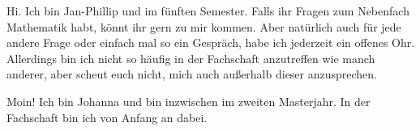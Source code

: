 \begin{multicols*}{2}
{Hi. Ich bin Jan-Phillip und im fünften Semester.
	Falls ihr Fragen zum Nebenfach Mathematik habt, könnt ihr gern zu mir kommen. Aber natürlich auch für jede andere Frage oder einfach mal so ein Gespräch, habe ich jederzeit ein offenes Ohr. Allerdings bin ich nicht so häufig in der Fachschaft anzutreffen wie manch anderer, aber scheut euch nicht, mich auch außerhalb dieser anzusprechen. 
	\vspace{\baselineskip}}

{Moin! Ich bin Johanna und bin inzwischen im zweiten Masterjahr. In der Fachschaft bin ich von Anfang an dabei.
}
	

\end{multicols*}
